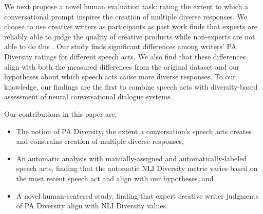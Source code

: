 \documentclass[11pt]{article}
\newcommand{\edivshort}{PA Diversity}
\newcommand{\edivshortspace}{PA Diversity }
\begin{document}
We next propose a novel human evaluation task: rating the extent to which a conversational prompt inspires the creation of multiple diverse responses.  We choose to use creative writers as participants as past work 
finds that experts are reliably able to judge the quality of 
creative products while non-experts are not able to do this \cite{amabile, baer}. 
Our study finds significant differences among writers' \edivshortspace ratings for different speech acts.  We also find that these differences align with both the measured differences from the original dataset and our hypotheses about which speech acts cause more diverse responses.  To our knowledge, our findings are the first to combine speech acts with diversity-based assessment of neural conversational dialogue systems.

Our contributions in this paper are:
\begin{itemize}[noitemsep,topsep=0pt]
    \item The notion of \edivshort, the extent a conversation's speech acts creates and constrains creation of multiple diverse responses, 
    \item An automatic analysis with manually-assigned and automatically-labeled speech acts, finding that the automatic NLI Diversity metric varies based on the most recent speech act and align with our hypotheses, and
    \item A novel human-centered study, finding that expert creative writer judgments of PA Diversity align with NLI Diversity values.
\end{itemize}
\end{document}
